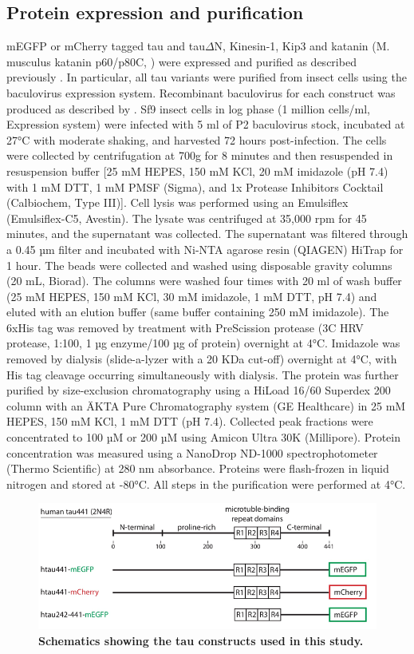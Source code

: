 \subsection{Protein expression and purification} 
mEGFP or mCherry tagged tau and tau$\Delta$N, Kinesin-1, Kip3 and katanin (M. musculus katanin p60/p80C, \cite{Jiang2017}) were expressed and purified as described previously \parencite{HERNANDEZVEGA20172304,Herrmann2018,Mitra2018,NITZSCHE2010247}. In particular, all tau variants  were purified from insect cells using the baculovirus expression system. Recombinant baculovirus for each construct was produced as described by \cite{woodruff2015method}. Sf9 insect cells in log phase (1 million cells/ml, Expression system) were infected with 5 ml of P2 baculovirus stock, incubated at 27°C with moderate shaking, and harvested 72 hours post-infection. The cells were collected by centrifugation at 700g for 8 minutes and then resuspended in resuspension buffer [25 mM HEPES, 150 mM KCl, 20 mM imidazole (pH 7.4) with 1 mM DTT, 1 mM PMSF (Sigma), and 1x Protease Inhibitors Cocktail (Calbiochem, Type III)]. Cell lysis was performed using an Emulsiflex (Emulsiflex-C5, Avestin). The lysate was centrifuged at 35,000 rpm for 45 minutes, and the supernatant was collected. The supernatant was filtered through a 0.45 µm filter and incubated with Ni-NTA agarose resin (QIAGEN) HiTrap for 1 hour. The beads were collected and washed using disposable gravity columns (20 mL, Biorad). The columns were washed four times with 20 ml of wash buffer (25 mM HEPES, 150 mM KCl, 30 mM imidazole, 1 mM DTT, pH 7.4) and eluted with an elution buffer (same buffer containing 250 mM imidazole). The 6xHis tag was removed by treatment with PreScission protease (3C HRV protease, 1:100, 1 µg enzyme/100 µg of protein) overnight at 4°C. Imidazole was removed by dialysis (slide-a-lyzer with a 20 KDa cut-off) overnight at 4°C, with His tag cleavage occurring simultaneously with dialysis. The protein was further purified by size-exclusion chromatography using a HiLoad 16/60 Superdex 200 column with an ÄKTA Pure Chromatography system (GE Healthcare) in 25 mM HEPES, 150 mM KCl, 1 mM DTT (pH 7.4). Collected peak fractions were concentrated to 100 µM or 200 µM using Amicon Ultra 30K (Millipore). Protein concentration was measured using a NanoDrop ND-1000 spectrophotometer (Thermo Scientific) at 280 nm absorbance. Proteins were flash-frozen in liquid nitrogen and stored at -80°C. All steps in the purification were performed at 4°C. 

\begin{figure}[h]
	\centering
	\includegraphics[width=0.6\linewidth]{Figures/tauconstructs.png}
	\caption[Schematics showing the tau constructs used in this study.]{
		\textbf{Schematics showing the tau constructs used in this study.}
		}\label{tauconstructs}
\end{figure}

